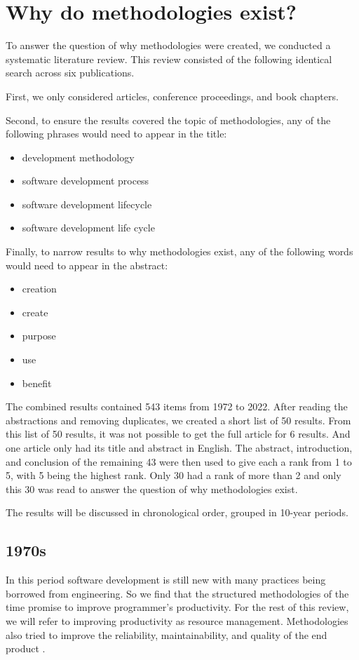 \section{Why do methodologies exist?}
\label{sec:meth_why}
To answer the question of why methodologies were created, we conducted a systematic literature review.
This review consisted of the following identical search across six publications.

First, we only considered articles, conference proceedings, and book chapters.

Second, to ensure the results covered the topic of methodologies, any of the following phrases would need to appear in the title:
\begin{itemize}
    \item development methodology
    \item software development process
    \item software development lifecycle
    \item software development life cycle
\end{itemize}

Finally, to narrow results to why methodologies exist, any of the following words would need to appear in the abstract:
\begin{itemize}
    \item creation
    \item create
    \item purpose
    \item use
    \item benefit
\end{itemize}

The combined results contained 543 items from 1972 to 2022.
After reading the abstractions and removing duplicates, we created a short list of 50 results.
From this list of 50 results, it was not possible to get the full article for 6 results.
And one article only had its title and abstract in English.
The abstract, introduction, and conclusion of the remaining 43 were then used to give each a rank from 1 to 5, with 5 being the highest rank.
Only 30 had a rank of more than 2 and only this 30 was read to answer the question of why methodologies exist.

The results will be discussed in chronological order, grouped in 10-year periods.

\subsection{1970s}
In this period software development is still new with many practices being borrowed from engineering.
So we find that the structured methodologies of the time promise to improve programmer's productivity.
For the rest of this review, we will refer to improving productivity as resource management.
Methodologies also tried to improve the reliability, maintainability, and quality of the end product \cite{yourdon_1977}.

